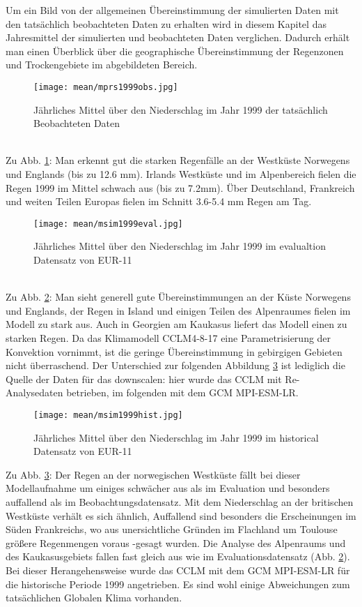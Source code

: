 Um ein Bild von der allgemeinen Übereinstimmung der simulierten Daten mit den tatsächlich beobachteten Daten zu erhalten wird in diesem Kapitel das Jahresmittel der simulierten und beobachteten Daten verglichen. Dadurch erhält man einen Überblick über die geographische Übereinstimmung der Regenzonen und Trockengebiete im abgebildeten Bereich.
\begin{figure}[h]
	\texttt{[image: mean/mprs1999obs.jpg]}
	\caption{Jährliches Mittel über den Niederschlag im Jahr 1999 der tatsächlich Beobachteten Daten}
	\label{fig:mobs99}
\end{figure}
\\
Zu Abb. \ref{fig:mobs99}: Man erkennt gut die starken Regenfälle an der Westküste Norwegens und Englands (bis zu 12.6 mm). Irlands Westküste und im Alpenbereich fielen die Regen 1999 im Mittel schwach aus (bis zu 7.2mm). Über Deutschland, Frankreich und weiten Teilen Europas fielen im Schnitt 3.6-5.4 mm Regen am Tag.\\
\begin{figure}[h]
	\texttt{[image: mean/msim1999eval.jpg]}
	\caption{Jährliches Mittel über den Niederschlag im Jahr 1999 im evalualtion Datensatz von EUR-11}
	\label{fig:meval99}
\end{figure}
 \\
Zu Abb. \ref{fig:meval99}: Man sieht generell gute Übereinstimmungen an der Küste Norwegens und Englands, der Regen in Island und einigen Teilen des Alpenraumes fielen im Modell zu stark aus. Auch in Georgien am Kaukasus liefert das Modell einen zu starken Regen. Da das Klimamodell CCLM4-8-17 eine Parametrisierung der Konvektion vornimmt, ist die geringe Übereinstimmung in gebirgigen Gebieten nicht überraschend. Der Unterschied zur folgenden Abbildung \ref{fig:mhist99} ist lediglich die Quelle der Daten für das downscalen: hier wurde das CCLM mit Re-Analysedaten betrieben, im folgenden mit dem GCM MPI-ESM-LR.\\

\begin{figure}[h]
	\texttt{[image: mean/msim1999hist.jpg]}
	\caption{Jährliches Mittel über den Niederschlag im Jahr 1999 im historical Datensatz von EUR-11}
	\label{fig:mhist99}
\end{figure}
Zu Abb. \ref{fig:mhist99}: Der Regen an der norwegischen Westküste fällt bei dieser Modellaufnahme um einiges schwächer aus als im Evaluation und besonders auffallend als im Beobachtungsdatensatz. Mit dem Niederschlag an der britischen Westküste verhält es sich ähnlich, Auffallend sind besonders die Erscheinungen im Süden Frankreichs, wo aus unersichtliche Gründen im Flachland um Toulouse größere Regenmengen \glqq voraus \grqq-gesagt wurden. Die Analyse des Alpenraums und des Kaukasusgebiets fallen fast gleich aus wie im Evaluationsdatensatz (Abb. \ref{fig:meval99}). Bei dieser Herangehensweise wurde das CCLM mit dem GCM MPI-ESM-LR für die historische Periode 1999 angetrieben. Es sind wohl einige Abweichungen zum tatsächlichen Globalen Klima vorhanden.